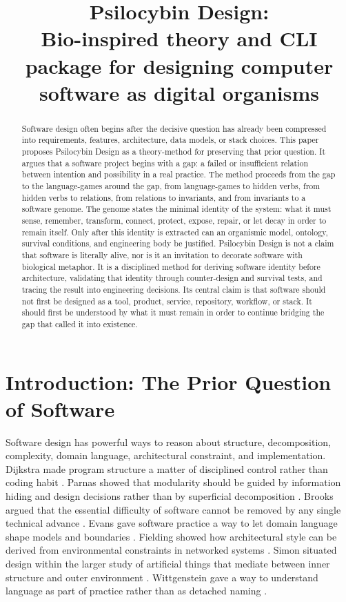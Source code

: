 \documentclass[11pt]{article}
\title{Psilocybin Design:\\Bio-inspired theory and CLI package for designing computer software as digital organisms}
\author{}
\date{}
\begin{document}
\maketitle

\begin{abstract}
Software design often begins after the decisive question has already been compressed into requirements, features, architecture, data models, or stack choices. This paper proposes Psilocybin Design as a theory-method for preserving that prior question. It argues that a software project begins with a gap: a failed or insufficient relation between intention and possibility in a real practice. The method proceeds from the gap to the language-games around the gap, from language-games to hidden verbs, from hidden verbs to relations, from relations to invariants, and from invariants to a software genome. The genome states the minimal identity of the system: what it must sense, remember, transform, connect, protect, expose, repair, or let decay in order to remain itself. Only after this identity is extracted can an organismic model, ontology, survival conditions, and engineering body be justified. Psilocybin Design is not a claim that software is literally alive, nor is it an invitation to decorate software with biological metaphor. It is a disciplined method for deriving software identity before architecture, validating that identity through counter-design and survival tests, and tracing the result into engineering decisions. Its central claim is that software should not first be designed as a tool, product, service, repository, workflow, or stack. It should first be understood by what it must remain in order to continue bridging the gap that called it into existence.
\end{abstract}

\section{Introduction: The Prior Question of Software}

Software design has powerful ways to reason about structure, decomposition, complexity, domain language, architectural constraint, and implementation. Dijkstra made program structure a matter of disciplined control rather than coding habit \cite{dijkstra1968}. Parnas showed that modularity should be guided by information hiding and design decisions rather than by superficial decomposition \cite{parnas1972}. Brooks argued that the essential difficulty of software cannot be removed by any single technical advance \cite{brooks1987}. Evans gave software practice a way to let domain language shape models and boundaries \cite{evans2003}. Fielding showed how architectural style can be derived from environmental constraints in networked systems \cite{fielding2000}. Simon situated design within the larger study of artificial things that mediate between inner structure and outer environment \cite{simon2019}. Wittgenstein gave a way to understand language as part of practice rather than as detached naming \cite{wittgenstein2009}.
\end{document}
